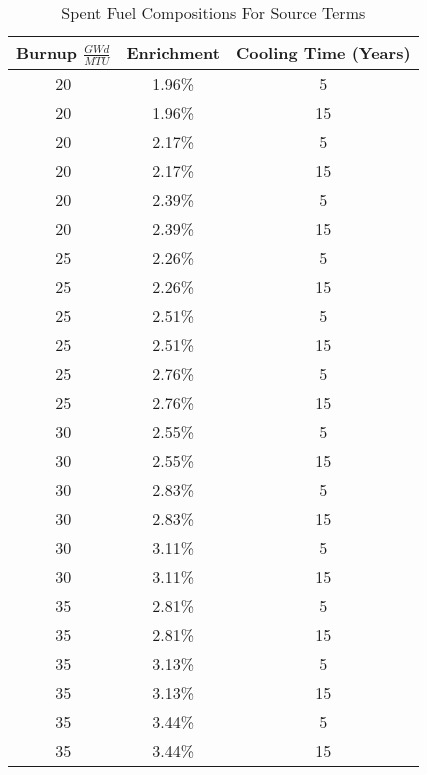 \begin{table}[p!]
\caption{Spent Fuel Compositions For Source Terms}
\label{source1}
\begin{center}
\begin{tabular}[b]{|c|c|c|}
	\hline
	Burnup $\frac{GWd}{MTU}$ & Enrichment & Cooling Time (Years)\\ \hline
	20 & 1.96\% & 5 \\ \hline
	20 & 1.96\% & 15 \\ \hline
	20 & 2.17\% & 5 \\ \hline
	20 & 2.17\% & 15 \\ \hline
	20 & 2.39\% & 5 \\ \hline
	20 & 2.39\% & 15 \\ \hline
	25 & 2.26\% & 5 \\ \hline
	25 & 2.26\% & 15 \\ \hline
	25 & 2.51\% & 5 \\ \hline
	25 & 2.51\% & 15 \\ \hline
	25 & 2.76\% & 5 \\ \hline
	25 & 2.76\% & 15 \\ \hline
	30 & 2.55\% & 5 \\ \hline
	30 & 2.55\% & 15 \\ \hline
	30 & 2.83\% & 5 \\ \hline
	30 & 2.83\% & 15 \\ \hline
	30 & 3.11\% & 5 \\ \hline
	30 & 3.11\% & 15 \\ \hline
	35 & 2.81\% & 5 \\ \hline
	35 & 2.81\% & 15 \\ \hline
	35 & 3.13\% & 5 \\ \hline
	35 & 3.13\% & 15 \\ \hline
	35 & 3.44\% & 5 \\ \hline
	35 & 3.44\% & 15 \\ \hline


\end{tabular}
\end{center}
\end{table}



